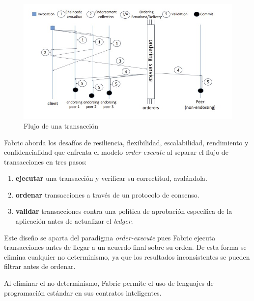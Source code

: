 \begin{figure}[tbph]
\centering
\includegraphics[width=\textwidth]{Images/transaction_flow}
\caption{Flujo de una transacción}
\label{fig:transactionflow}
\end{figure}


Fabric aborda los desafíos de resiliencia, flexibilidad, escalabilidad, rendimiento y confidencialidad que enfrenta el modelo \textit{order-execute} al separar el flujo de transacciones en tres pasos:

\begin{enumerate}
 \item \textbf{ejecutar} una transacción y verificar su correctitud, avalándola.
 \item \textbf{ordenar} transacciones a través de un protocolo de consenso.
   \item \textbf{validar} transacciones contra una política de aprobación específica de la aplicación antes de actualizar el \textit{ledger}.
\end{enumerate}

Este diseño se aparta del paradigma \textit{order-execute} pues Fabric ejecuta transacciones antes de llegar a un acuerdo final sobre su orden. De esta forma se elimina cualquier no determinismo, ya que los resultados inconsistentes se pueden filtrar antes de ordenar.

Al eliminar el no determinismo, Fabric permite el uso de lenguajes de programación estándar en sus contratos inteligentes. 


